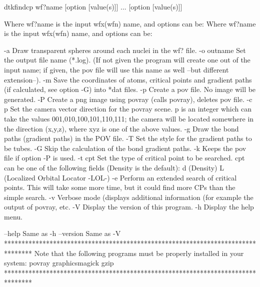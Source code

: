 	dtkfindcp wf?name [option [value(s)]] ... [option [value(s)]]

Where wf?name is the input wfx(wfn) name, and options can be:
Where wf?name is the input wfx(wfn) name, and options can be:

  -a        	Draw transparent spheres around each nuclei in the wf? file.
  -o outname	Set the output file name (*.log).
            	  (If not given the program will create one out of
            	  the input name; if given, the pov file will
            	  use this name as well --but different extension--).
  -m        	Save the coordinates of atoms, critical points and gradient
            	  paths (if calculated, see option -G) into *dat files.
  -p     	Create a pov file. No image will be generated.
  -P     	Create a png image using povray (calls povray),
         	  deletes pov file.
  -c p   	Set the camera vector direction for the povray scene.
         	  p is an integer which can take the values
         	  001,010,100,101,110,111; the camera will be located
         	  somewhere in the direction (x,y,z), where xyz is one of 
         	  the above values.
  -g     	Draw the bond paths (gradient paths) in the POV file.
  -T     	Set the style for the gradient paths to be tubes.
  -G     	Skip the calculation of the bond gradient paths.
  -k     	Keeps the pov file if option -P is used.
  -t cpt 	Set the type of critical point to be searched. cpt can be 
         	  one of the following fields (Density is the default):
         		d (Density)
         		L (Localized Orbital Locator -LOL-)
  -e     	Perform an extended search of critical points. This
         	  will take some more time, but it could find more CPs
         	  than the simple search.
  -v     	Verbose mode (displays additional information (for example the 
         	  output of povray, etc.
  -V        	Display the version of this program.
  -h		Display the help menu.

  --help    		Same as -h
  --version 		Same as -V
********************************************************************************
  Note that the following programs must be properly installed in your system:
                                     povray
                                 graphicsmagick
                                      gzip
********************************************************************************
